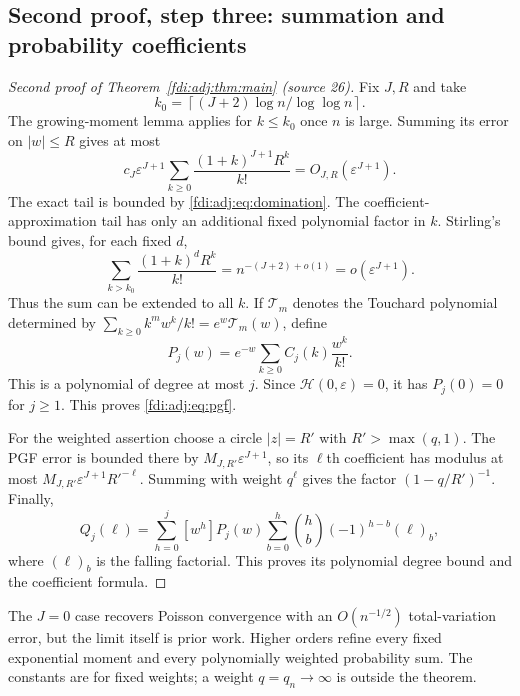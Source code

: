 \documentclass[11pt,letterpaper]{article}
\theoremstyle{remark}\newtheorem{remark}[theorem]{Remark}
\newcommand{\eps}{\varepsilon}\newcommand{\Pois}{\operatorname{Poisson}}
\newcommand{\ceil}[1]{\left\lceil #1\right\rceil}
\begin{document}
\subsection{Second proof, step three: summation and probability coefficients}\label{fdi:adj:sec:summation}
\begin{proof}[Second proof of Theorem~\ref{fdi:adj:thm:main} (source 26)]
Fix $J,R$ and take
\[
 k_0=\ceil{(J+2)\log n/\log\log n}.
\]
The growing-moment lemma applies for $k\le k_0$ once $n$ is large. Summing its error on $|w|\le R$ gives at most
\[
 c_J\eps^{J+1}\sum_{k\ge0}\frac{(1+k)^{J+1}R^k}{k!}
 =O_{J,R}(\eps^{J+1}).
\]
The exact tail is bounded by \eqref{fdi:adj:eq:domination}. The coefficient-approximation tail has only an additional fixed polynomial factor in $k$. Stirling's bound gives, for each fixed $d$,
\[
 \sum_{k>k_0}\frac{(1+k)^dR^k}{k!}=n^{-(J+2)+o(1)}=o(\eps^{J+1}).
\]
Thus the sum can be extended to all $k$. If $\mathcal T_m$ denotes the Touchard polynomial determined by
$\sum_{k\ge0}k^mw^k/k!=e^w\mathcal T_m(w)$, define
\begin{equation}\label{fdi:adj:eq:touchard}
 P_j(w)=e^{-w}\sum_{k\ge0}C_j(k)\frac{w^k}{k!}.
\end{equation}
This is a polynomial of degree at most $j$. Since $\mathcal H(0,\eps)=0$, it has $P_j(0)=0$ for $j\ge1$. This proves \eqref{fdi:adj:eq:pgf}.

For the weighted assertion choose a circle $|z|=R'$ with $R'>\max(q,1)$. The PGF error is bounded there by $M_{J,R'}\eps^{J+1}$, so its $\ell$th coefficient has modulus at most $M_{J,R'}\eps^{J+1}R'^{-\ell}$. Summing with weight $q^\ell$ gives the factor $(1-q/R')^{-1}$. Finally,
\begin{equation}\label{fdi:adj:eq:charlier}
 Q_j(\ell)=\sum_{h=0}^j[w^h]P_j(w)
 \sum_{b=0}^h\binom hb(-1)^{h-b}(\ell)_b,
\end{equation}
where $(\ell)_b$ is the falling factorial. This proves its polynomial degree bound and the coefficient formula.
\end{proof}

The $J=0$ case recovers Poisson convergence with an $O(n^{-1/2})$ total-variation error, but the limit itself is prior work. Higher orders refine every fixed exponential moment and every polynomially weighted probability sum. The constants are for fixed weights; a weight $q=q_n\to\infty$ is outside the theorem.
\end{document}
